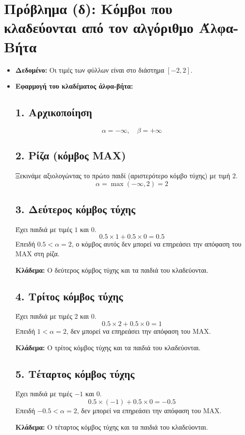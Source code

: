 \documentclass{article}
\begin{document}
\section*{Πρόβλημα (δ): Κόμβοι που κλαδεύονται από τον αλγόριθμο Άλφα-Βήτα}

\begin{itemize}
    \item \textbf{Δεδομένο:} Οι τιμές των φύλλων είναι στο διάστημα \([-2, 2]\).
    \item \textbf{Εφαρμογή του κλαδέματος άλφα-βήτα:}

    \subsection*{1. Αρχικοποίηση}
    \[
    \alpha = -\infty, \quad \beta = +\infty
    \]

    \subsection*{2. Ρίζα (κόμβος MAX)}
    Ξεκινάμε αξιολογώντας το πρώτο παιδί (αριστερότερο κόμβο τύχης) με τιμή \(2\).
    \[
    \alpha = \max(-\infty, 2) = 2
    \]

    \subsection*{3. Δεύτερος κόμβος τύχης}
    Έχει παιδιά με τιμές \(1\) και \(0\).
    \[
    0.5 \times 1 + 0.5 \times 0 = 0.5
    \]
    Επειδή \(0.5 < \alpha = 2\), ο κόμβος αυτός δεν μπορεί να επηρεάσει την απόφαση του MAX στη ρίζα.

    \textbf{Κλάδεμα:} Ο δεύτερος κόμβος τύχης και τα παιδιά του κλαδεύονται.

    \subsection*{4. Τρίτος κόμβος τύχης}
    Έχει παιδιά με τιμές \(2\) και \(0\).
    \[
    0.5 \times 2 + 0.5 \times 0 = 1
    \]
    Επειδή \(1 < \alpha = 2\), δεν μπορεί να επηρεάσει την απόφαση του MAX.

    \textbf{Κλάδεμα:} Ο τρίτος κόμβος τύχης και τα παιδιά του κλαδεύονται.

    \subsection*{5. Τέταρτος κόμβος τύχης}
    Έχει παιδιά με τιμές \(-1\) και \(0\).
    \[
    0.5 \times (-1) + 0.5 \times 0 = -0.5
    \]
    Επειδή \(-0.5 < \alpha = 2\), δεν μπορεί να επηρεάσει την απόφαση του MAX.

    \textbf{Κλάδεμα:} Ο τέταρτος κόμβος τύχης και τα παιδιά του κλαδεύονται.
\end{itemize}
\end{document}
